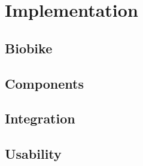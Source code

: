 \chapter{Implementation}
\label{chap-five}

\section{Biobike}

\section{Components}

\section{Integration}

\section{Usability}
